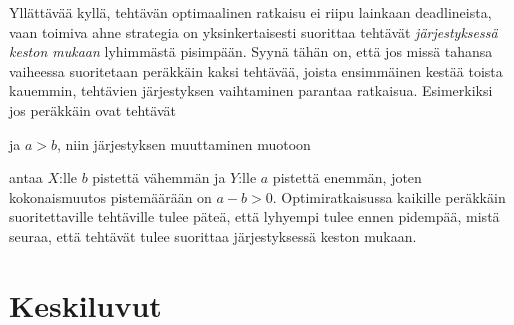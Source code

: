 Yllättävää kyllä, tehtävän optimaalinen ratkaisu
ei riipu lainkaan deadlineista,
vaan toimiva ahne strategia on
yksinkertaisesti
suorittaa tehtävät \emph{järjestyksessä keston mukaan}
lyhimmästä pisimpään.
Syynä tähän on, että jos missä tahansa vaiheessa
suoritetaan peräkkäin kaksi tehtävää,
joista ensimmäinen kestää toista kauemmin,
tehtävien järjestyksen vaihtaminen parantaa ratkaisua.
Esimerkiksi jos peräkkäin ovat tehtävät
\begin{center}
\end{center}
ja $a>b$, niin järjestyksen muuttaminen muotoon
\begin{center}
\end{center}
antaa $X$:lle $b$ pistettä vähemmän ja $Y$:lle $a$ pistettä enemmän,
joten kokonaismuutos pistemäärään on $a-b > 0$.
Optimiratkaisussa
kaikille peräkkäin suoritettaville tehtäville
tulee päteä, että lyhyempi tulee ennen pidempää,
mistä seuraa, että tehtävät tulee suorittaa
järjestyksessä keston mukaan.

\section{Keskiluvut}

